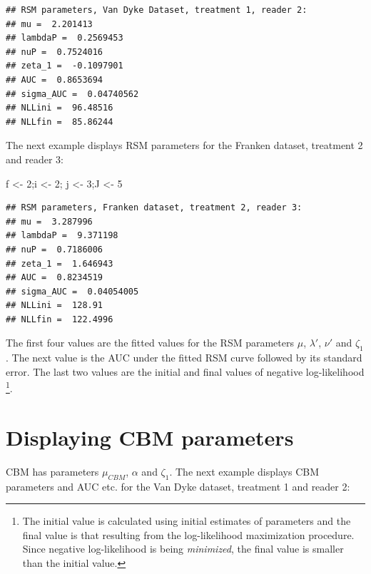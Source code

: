 \documentclass[
]{book}
\newenvironment{Shaded}{\begin{snugshade}}{\end{snugshade}}
\newcommand{\DecValTok}[1]{\textcolor[rgb]{0.00,0.00,0.81}{#1}}
\newcommand{\NormalTok}[1]{#1}
\newcommand{\StringTok}[1]{\textcolor[rgb]{0.31,0.60,0.02}{#1}}
\begin{document}
\begin{verbatim}
## RSM parameters, Van Dyke Dataset, treatment 1, reader 2: 
## mu =  2.201413 
## lambdaP =  0.2569453 
## nuP =  0.7524016 
## zeta_1 =  -0.1097901 
## AUC =  0.8653694 
## sigma_AUC =  0.04740562 
## NLLini =  96.48516 
## NLLfin =  85.86244
\end{verbatim}

The next example displays RSM parameters for the Franken dataset, treatment 2 and reader 3:

\begin{Shaded}
\begin{Highlighting}[]
\NormalTok{f <-}\StringTok{ }\DecValTok{2}\NormalTok{;i <-}\StringTok{ }\DecValTok{2}\NormalTok{; j <-}\StringTok{ }\DecValTok{3}\NormalTok{;J <-}\StringTok{ }\DecValTok{5}
\end{Highlighting}
\end{Shaded}

\begin{verbatim}
## RSM parameters, Franken dataset, treatment 2, reader 3: 
## mu =  3.287996 
## lambdaP =  9.371198 
## nuP =  0.7186006 
## zeta_1 =  1.646943 
## AUC =  0.8234519 
## sigma_AUC =  0.04054005 
## NLLini =  128.91 
## NLLfin =  122.4996
\end{verbatim}

The first four values are the fitted values for the RSM parameters \(\mu\), \(\lambda'\), \(\nu'\) and \(\zeta_1\). The next value is the AUC under the fitted RSM curve followed by its standard error. The last two values are the initial and final values of negative log-likelihood \footnote{The initial value is calculated using initial estimates of parameters and the final value is that resulting from the log-likelihood maximization procedure. Since negative log-likelihood is being \emph{minimized}, the final value is smaller than the initial value.}.

\hypertarget{rsm-3-fits-cbm-parameters}{%
\section{Displaying CBM parameters}\label{rsm-3-fits-cbm-parameters}}

CBM has parameters \(\mu_{CBM}\), \(\alpha\) and \(\zeta_1\). The next example displays CBM parameters and AUC etc. for the Van Dyke dataset, treatment 1 and reader 2:
\end{document}
